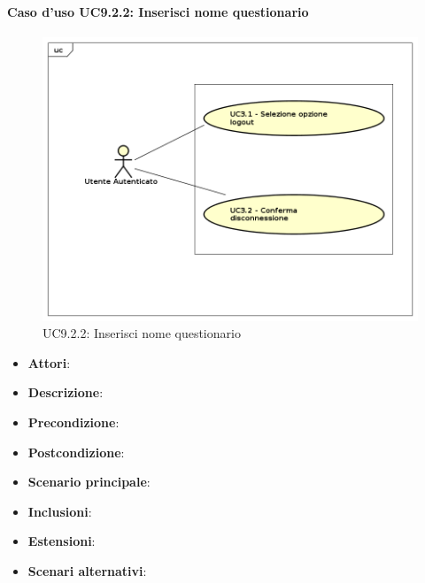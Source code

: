 		\paragraph{Caso d'uso UC9.2.2: Inserisci nome questionario}
		\label{UC9.2.2}
		\begin{figure}[h]
			\centering
		\includegraphics[scale=0.7,keepaspectratio]{UML/UC9.png}
			\caption{UC9.2.2: Inserisci nome questionario}
		\end{figure}
		\FloatBarrier
		\begin{itemize}
			\item \textbf{Attori}: 
			\item \textbf{Descrizione}: 
			\item \textbf{Precondizione}: 
			\item \textbf{Postcondizione}: 
			\item \textbf{Scenario principale}:
			\item \textbf{Inclusioni}:
			\item \textbf{Estensioni}:
			\item \textbf{Scenari alternativi}:
		\end{itemize}
		
